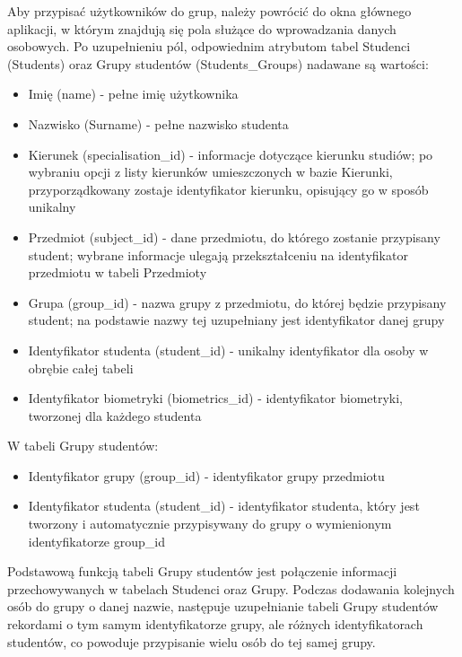 Aby przypisać użytkowników do grup, należy powrócić do okna głównego aplikacji, w którym znajdują się pola służące do wprowadzania danych osobowych. Po uzupełnieniu pól, odpowiednim atrybutom tabel Studenci (Students) oraz Grupy studentów (Students\_Groups) nadawane są wartości:
\begin{itemize}
W tabeli Studenci:
\item Imię (name) - pełne imię użytkownika
\item Nazwisko (Surname) - pełne nazwisko studenta
\item Kierunek (specialisation\_id) - informacje dotyczące kierunku studiów; po wybraniu opcji z listy kierunków umieszczonych w bazie Kierunki, przyporządkowany zostaje identyfikator kierunku, opisujący go w sposób unikalny
\item Przedmiot (subject\_id) - dane przedmiotu, do którego zostanie przypisany student; wybrane informacje ulegają przekształceniu na identyfikator przedmiotu w tabeli Przedmioty
\item Grupa (group\_id) - nazwa grupy z przedmiotu, do której będzie przypisany student; na podstawie nazwy tej uzupełniany jest identyfikator danej grupy
\item Identyfikator studenta (student\_id) - unikalny identyfikator dla osoby w obrębie całej tabeli
\item Identyfikator biometryki (biometrics\_id) - identyfikator biometryki, tworzonej dla każdego studenta
\end{itemize}

W tabeli Grupy studentów:
\begin{itemize}
\item Identyfikator grupy (group\_id) - identyfikator grupy przedmiotu
\item Identyfikator studenta (student\_id) - identyfikator studenta, który jest tworzony i automatycznie przypisywany do grupy o wymienionym identyfikatorze group\_id
\end{itemize}

Podstawową funkcją tabeli Grupy studentów jest połączenie informacji przechowywanych w tabelach Studenci oraz Grupy. Podczas dodawania kolejnych osób do grupy o danej nazwie, następuje uzupełnianie tabeli Grupy studentów rekordami o tym samym identyfikatorze grupy, ale różnych identyfikatorach studentów, co powoduje przypisanie wielu osób do tej samej grupy. 

